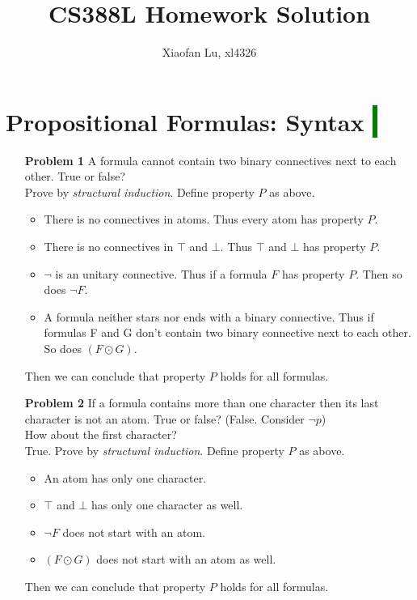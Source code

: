 \documentclass[12pt]{article}
\begin{document}
\title{CS388L Homework Solution}
\author{Xiaofan Lu, xl4326}
\date{\vspace{-3ex}}
\maketitle

\section{Propositional Formulas: Syntax  \colorbox{green}{$~$ }}
\begin{enumerate}
\item[\textbf{Problem 1}] A formula cannot contain two binary connectives next to each other. True or false?\\
Prove by \textit{structural induction}. Define property $P$ as above. 
\begin{itemize}
\item There is no connectives in atoms. Thus every atom has property $P$. 
\item There is no connectives in $\top$ and $\bot$. Thus $\top$ and $\bot$ has property $P$. 
\item $\neg$ is an unitary connective. Thus if a formula $F$ has property $P$. Then so does $\neg F$. 
\item A formula neither stars nor ends with a binary connective. Thus if formulas F and G don't contain two binary connective next to each other. So does $(F \odot G)$. 
\end{itemize}
\noindent Then we can conclude that property $P$ holds for all formulas. 

\item[\textbf{Problem 2}] If a formula contains more than one character then its last character is not an atom. True or false?     (False. Consider $\neg p$)  \\
How about the first character? \\
True. Prove by \textit{structural induction}. Define property $P$ as above. 
\begin{itemize}
\item An atom has only one character. 
\item $\top$ and $\bot$ has only one character as well. 
\item $\neg F$ does not start with an atom. 
\item $(F \odot G)$ does not start with an atom as well.   
\end{itemize}
\noindent Then we can conclude that property $P$ holds for all formulas. 
\end{enumerate}
\end{document}
